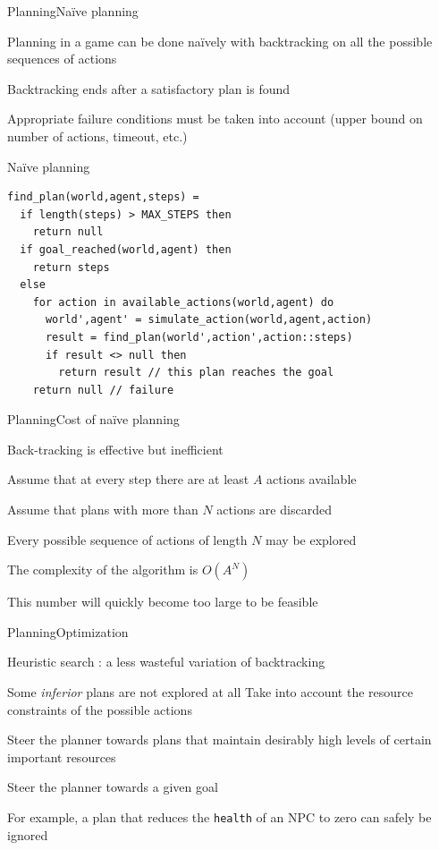 \documentclass{beamer}
\begin{document}
\begin{slide}{Planning}{Naïve planning}{
\item Planning in a game can be done naïvely with backtracking on all the possible sequences of actions
\item Backtracking ends after a satisfactory plan is found
\item Appropriate failure conditions must be taken into account (upper bound on number of actions, timeout, etc.)
}\end{slide}

\begin{frame}[fragile]{Naïve planning}
\begin{lstlisting}
find_plan(world,agent,steps) =
  if length(steps) > MAX_STEPS then
    return null
  if goal_reached(world,agent) then
    return steps
  else
    for action in available_actions(world,agent) do
      world',agent' = simulate_action(world,agent,action)
      result = find_plan(world',action',action::steps)
      if result <> null then
        return result // this plan reaches the goal
    return null // failure
\end{lstlisting}
\end{frame}

\begin{slide}{Planning}{Cost of naïve planning}{
\item Back-tracking is effective but inefficient
\item Assume that at every step there are at least $A$ actions available
\item Assume that plans with more than $N$ actions are discarded
\pause
\item Every possible sequence of actions of length $N$ may be explored
\item The complexity of the algorithm is $O(A^N)$
\item This number will quickly become too large to be feasible
}\end{slide}

\begin{slide}{Planning}{Optimization}{
\item Heuristic search \cite{HEURISTIC_SEARCH}: a less wasteful variation of backtracking
\item Some \textit{inferior} plans are not explored at all
Take into account the resource constraints of the possible actions \cite{HEURISTIC_PLANNING_WITH_RESOURCES}
\item Steer the planner towards plans that maintain desirably high levels of certain important resources
\item Steer the planner towards a given goal
\item For example, a plan that reduces the \texttt{health} of an NPC to zero can safely be ignored
}\end{slide}
\end{document}
